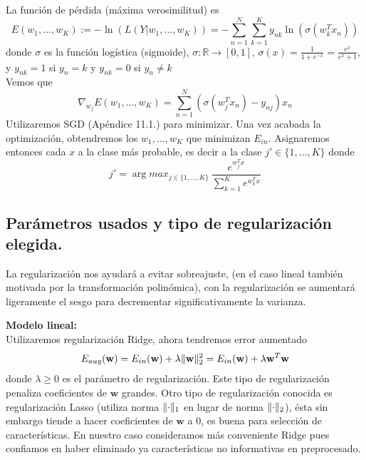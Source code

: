 \documentclass[11pt,a4paper]{article}
\DeclarePairedDelimiter{\norm}{\lVert}{\rVert}
\theoremstyle{definition}
\newcommand{\R}{\mathbb{R}}
\begin{document}
	
	La función de pérdida (máxima verosimilitud) es
	$$E(w_1,\ldots,w_K):=-\ln \left( L(Y|w_1,\ldots ,w_K) \right)=-\sum_{n=1}^N \sum_{k=1}^K y_{nk} \ln \left( \sigma(w_k^T x_n) \right)$$
	donde $\sigma$ es la función logística (sigmoide), $\sigma\colon \R \to [0,1]$, $\sigma(x)=\frac{1}{1+e^{-x}}=\frac{e^x}{e^x+1}$, y $y_{nk} =1$ si $y_n=k$ y $y_{nk}=0$ si $y_n\neq k$\\
	Vemos que
	$$\nabla_{w_j} E(w_1,\ldots,w_K)=\sum_{n=1}^N (\sigma(w_j^T x_n)-y_{nj}) x_n$$
	Utilizaremos SGD (Apéndice 11.1.) para minimizar. Una vez acabada la optimización, obtendremos los $w_1,\ldots ,w_K$ que minimizan $E_{in}$. %
	 Asignaremos entonces cada $x$ a la clase más probable, es decir a la clase $ j'\in \{1,\ldots,K\}$ donde
	 $$j'= \arg max_{j\in \{1,\ldots, K\}} \  \frac{e^{w_j^Tx}}{\sum_{k=1}^K e^{w_k^Tx}}$$
	\subsection{Parámetros usados y tipo de regularización elegida.}
	La regularización nos ayudará a evitar sobreajuste, (en el caso lineal también motivada por la transformación polinómica), con la regularización se aumentará ligeramente el sesgo para decrementar significativamente la varianza. 

	\textbf{Modelo lineal:}	\\
	Utilizaremos regularización Ridge, ahora tendremos error aumentado 
	$$E_{aug}(\mathbf{w})=E_{in}(\mathbf{w})+\lambda \norm{\mathbf{w}}_2^2 = E_{in}(\mathbf{w})+\lambda \mathbf{w}^T\mathbf{w}$$
	donde $\lambda \geq 0$ es el parámetro de regularización. Este tipo de regularización penaliza coeficientes de $\mathbf{w}$ grandes. Otro tipo de regularización conocida es regularización Lasso (utiliza norma $\norm{\cdot}_1$ en lugar de norma $\norm{\cdot}_2$), ésta sin embargo tiende a hacer coeficientes de $\mathbf{w}$ a 0, es buena para selección de características. En nuestro caso consideramos más conveniente Ridge pues confiamos en haber eliminado ya características no informativas en preprocesado.
	
	
\end{document}
